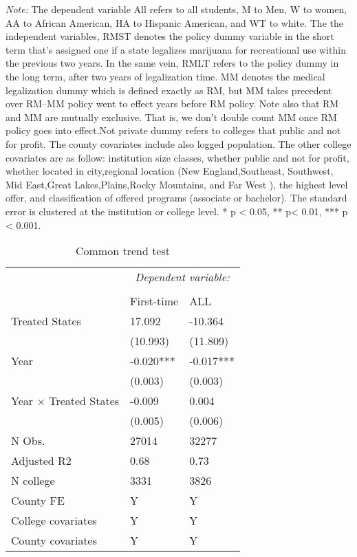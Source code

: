 \documentclass[12pt]{article}%
\begin{document}
\textit{Note:}  The dependent variable All refers to all students, M to Men, W to women, AA to African American, HA to Hispanic American, and WT to white. The the independent variables, RMST denotes the policy dummy variable in the short term that's assigned one if a state legalizes marijuana for recreational use within the previous two years. In the same vein, RMLT refers to the policy dummy in the long term, after two years of legalization time. MM denotes the medical legalization dummy which is defined exactly as RM, but MM takes precedent over RM--MM policy went to effect years before RM policy. Note also that RM and MM are mutually exclusive. That is, we don't double count MM once RM policy goes into effect.Not private dummy refers to colleges that public and not for profit. The county covariates include also logged population. The other college covariates are as follow: institution size classes, whether public and not for profit, whether located in city,regional location (New England,Southeast, Southwest, Mid East,Great Lakes,Plains,Rocky Mountains, and Far West ), the highest level offer, and  classification of offered programs (associate or bachelor). The standard error is clustered at the institution or college level.    * p \textless{} 0.05, ** p\textless{} 0.01, *** p \textless{} 0.001.

\FloatBarrier
\begin{table}\centering 
  \begin{threeparttable}
  \caption{Common trend  test }
   \label{table:ct}
\begin{tabular}{lll}
\toprule
 &  \multicolumn{2}{c}{\textit{Dependent variable:}} \\ 
\cline{2-3} 
\\[-1.8ex] 
& First-time & ALL \\
\midrule
Treated States & 17.092 & -10.364 \\
& (10.993) & (11.809) \\
Year & -0.020*** & -0.017*** \\
& (0.003) & (0.003) \\
Year $\times$ Treated States & -0.009 & 0.004 \\
& (0.005) & (0.006) \\
\hline
N Obs. & 27014 & 32277 \\
Adjusted R2 & 0.68 & 0.73 \\
N college & 3331 & 3826 \\
County FE & Y & Y \\
College covariates & Y & Y \\
County covariates & Y & Y \\
\bottomrule
\end{tabular}
  \end{threeparttable}
 
\end{table}
\FloatBarrier
\end{document}
